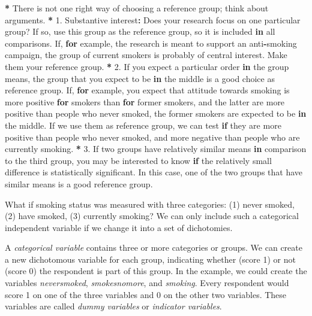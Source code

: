 \documentclass[a4paper]{book}
\newenvironment{Shaded}{\begin{snugshade}}{\end{snugshade}}
\newcommand{\DecValTok}[1]{\textcolor[rgb]{0.00,0.00,0.00}{#1}}
\newcommand{\StringTok}[1]{\textcolor[rgb]{0.00,0.00,0.00}{#1}}
\newcommand{\ControlFlowTok}[1]{\textcolor[rgb]{0.00,0.00,0.00}{\textbf{#1}}}
\newcommand{\OperatorTok}[1]{\textcolor[rgb]{0.00,0.00,0.00}{\textbf{#1}}}
\newcommand{\NormalTok}[1]{#1}
\theoremstyle{definition}
\theoremstyle{definition}
\theoremstyle{definition}
\theoremstyle{remark}
\begin{document}
\begin{Shaded}
\begin{Highlighting}[]
\OperatorTok{*}\StringTok{ }\NormalTok{There is not one right way of choosing a reference group; think about}
\NormalTok{arguments.}
\OperatorTok{*}\StringTok{ }\DecValTok{1}\NormalTok{. Substantive interest}\OperatorTok{:}\StringTok{ }\NormalTok{Does your research focus on one particular group? If}
\NormalTok{so, use this group as the reference group, so it is included }\ControlFlowTok{in}\NormalTok{ all}
\NormalTok{comparisons. If, }\ControlFlowTok{for}\NormalTok{ example, the research is meant to support an anti}\OperatorTok{-}\NormalTok{smoking}
\NormalTok{campaign, the group of current smokers is probably of central interest. Make}
\NormalTok{them your reference group.}
\OperatorTok{*}\StringTok{ }\DecValTok{2}\NormalTok{. If you expect a particular order }\ControlFlowTok{in}\NormalTok{ the group means, the group that you}
\NormalTok{expect to be }\ControlFlowTok{in}\NormalTok{ the middle is a good choice as reference group. If, }\ControlFlowTok{for}
\NormalTok{example, you expect that attitude towards smoking is more positive }\ControlFlowTok{for}\NormalTok{ smokers}
\NormalTok{than }\ControlFlowTok{for}\NormalTok{ former smokers, and the latter are more positive than people who never}
\NormalTok{smoked, the former smokers are expected to be }\ControlFlowTok{in}\NormalTok{ the middle. If we use them as}
\NormalTok{reference group, we can test }\ControlFlowTok{if}\NormalTok{ they are more positive than people who never}
\NormalTok{smoked, and more negative than people who are currently smoking.}
\OperatorTok{*}\StringTok{ }\DecValTok{3}\NormalTok{. If two groups have relatively similar means }\ControlFlowTok{in}\NormalTok{ comparison to the third}
\NormalTok{group, you may be interested to know }\ControlFlowTok{if}\NormalTok{ the relatively small difference is}
\NormalTok{statistically significant. In this case, one of the two groups that have}
\NormalTok{similar means is a good reference group.}
\end{Highlighting}
\end{Shaded}

What if smoking status was measured with three categories: (1) never
smoked, (2) have smoked, (3) currently smoking? We can only include such
a categorical independent variable if we change it into a set of
dichotomies.

A \emph{categorical variable} contains three or more categories or
groups. We can create a new dichotomous variable for each group,
indicating whether (score 1) or not (score 0) the respondent is part of
this group. In the example, we could create the variables
\emph{neversmoked}, \emph{smokesnomore}, and \emph{smoking}. Every
respondent would score 1 on one of the three variables and 0 on the
other two variables. These variables are called \emph{dummy variables}
or \emph{indicator variables}.
\end{document}
